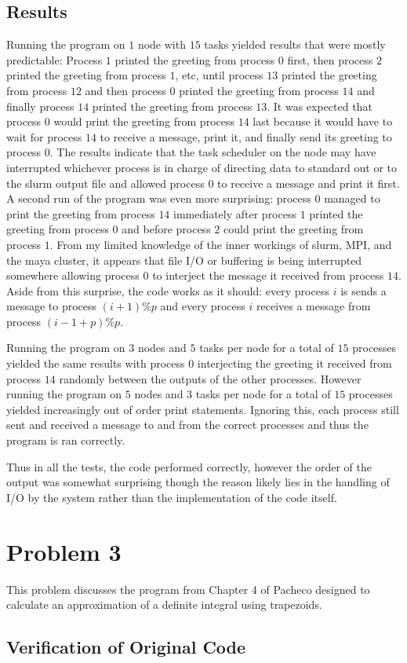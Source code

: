 \documentclass[11pt]{article}
\begin{document}
\subsection{Results}
Running the program on $1$ node with $15$ tasks yielded results that were mostly predictable: Process $1$ printed the greeting from process $0$ first, then process $2$ printed the greeting from process $1$, etc, until process $13$ printed the greeting from process $12$ and then process $0$ printed the greeting from process $14$ and finally process $14$ printed the greeting from process $13$. It was expected that process $0$ would print the greeting from process $14$ last because it would have to wait for process $14$ to receive a message, print it, and finally send its greeting to process $0$. The results indicate that the task scheduler on the node may have interrupted whichever process is in charge of directing data to standard out or to the slurm output file and allowed process $0$ to receive a message and print it first. A second run of the program was even more surprising: process $0$ managed to print the greeting from process $14$ immediately after process $1$ printed the greeting from process $0$ and before process $2$ could print the greeting from process $1$. From my limited knowledge of the inner workings of slurm, MPI, and the maya cluster, it appears that file I/O or buffering is being interrupted somewhere allowing process $0$ to interject the message it received from process $14$. Aside from this surprise, the code works as it should: every process $i$ is sends a message to process $(i+1)\%p$ and every process $i$  receives a message from process $(i-1+p) \% p$.

Running the program on $3$ nodes and $5$ tasks per node for a total of $15$ processes yielded the same results with process $0$ interjecting the greeting it received from process $14$ randomly between the outputs of the other processes. However running the program on $5$ nodes and $3$ tasks per node for a total of $15$ processes yielded increasingly out of order print statements. Ignoring this, each process still sent and received a message to and from the correct processes and thus the program is ran correctly.

Thus in all the tests, the code performed correctly, however the order of the output was somewhat surprising though the reason likely lies in the handling of I/O by the system rather than the implementation of the code itself.
\pagebreak


\pagebreak

\section{Problem 3}
This problem discusses the program from Chapter 4 of Pacheco designed to calculate an approximation of a definite integral using trapezoids.
\subsection{Verification of Original Code}
\end{document}
